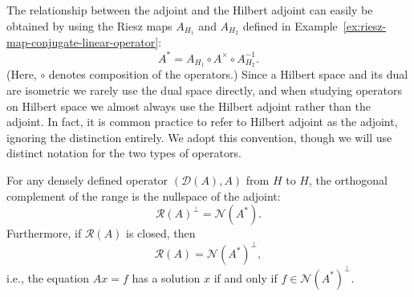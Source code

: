 The relationship between the adjoint and the Hilbert adjoint can easily be obtained by using the Riesz maps $A_{H_1}$ and $A_{H_2}$ defined in Example~\ref{ex:riesz-map-conjugate-linear-operator}:
\begin{equation}\label{eq:hilbert-and-banach-adjoint-riesz-relation}
A^*=A_{H_1}\circ A^\times\circ A_{H_2}^{-1}.
\end{equation}
(Here, $\circ$ denotes composition of the operators.) Since a Hilbert space and its dual are isometric we rarely use the dual space directly, and when studying operators on Hilbert space we almost always use the Hilbert adjoint rather than the adjoint. In fact, it is common practice to refer to Hilbert adjoint as the adjoint, ignoring the distinction entirely. We adopt this convention, though we will use distinct notation for the two types of operators.

\begin{Theorem}
\label{thm:range-complement-adjoint-nullspace}
For any densely defined operator $(\mathcal{D}(A),A)$ from $H$ to $H$, the orthogonal complement of the range is the nullspace of the adjoint:
\begin{equation}\label{eq:range-orthogonal-complement-adjoint-nullspace}
\mathcal{R}(A)^\perp=\mathcal{N}(A^*).
\end{equation}
Furthermore, if $\mathcal{R}(A)$ is closed, then
\begin{equation}\label{eq:closed-range-adjoint-nullspace-complement}
\mathcal{R}(A)=\mathcal{N}(A^*)^\perp,
\end{equation}
i.e., the equation $Ax=f$ has a solution $x$ if and only if $f\in\mathcal{N}(A^*)^\perp$.
\end{Theorem}

\begingroup
{}
\renewcommand{\endProof}{\par\nobreak\hfill$\blacksquare$\par\vspace{0.1cm}}
\endgroup
